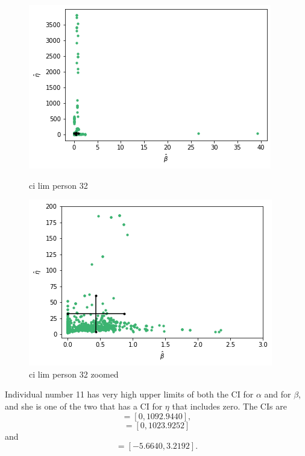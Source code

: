 \begin{figure}
    \centering
    \begin{minipage}{0.48\textwidth}
        \centering
        \includegraphics[scale=0.37]{pictures/ci_lim_b_e_person32.png}
        \caption{ci lim person 32}
        \label{fig:ci_lim_b_e_person_32}
    \end{minipage}\hfill
    \begin{minipage}{0.48\textwidth}
        \centering
        \includegraphics[scale=0.37]{pictures/ci_lim_b_e_person32_zoomed.png}
        \caption{ci lim person 32 zoomed}
        \label{fig:ci_lim_b_e_person_32_zoomed}
    \end{minipage}
\end{figure}

Individual number 11 has very high upper limits of both the CI for $\alpha$ and for $\beta$, and she is one of the two that has a CI for $\eta$ that includes zero. The CIs are
\begin{equation*}
    [\hat{\alpha}^{*(5)}_{1000},\hat{\alpha}^{*(95)}_{1000}] = [0,1092.9440],
\end{equation*}
\begin{equation*}
    [\hb^{*(5)}_{1000},\hb^{*(95)}_{1000}] = [0,1023.9252]
\end{equation*}
and
\begin{equation*}
    [\hat{\eta}^{*(5)}_{1000},\hat{\eta}^{*(95)}_{1000}] = [-5.6640,3.2192].
\end{equation*}

